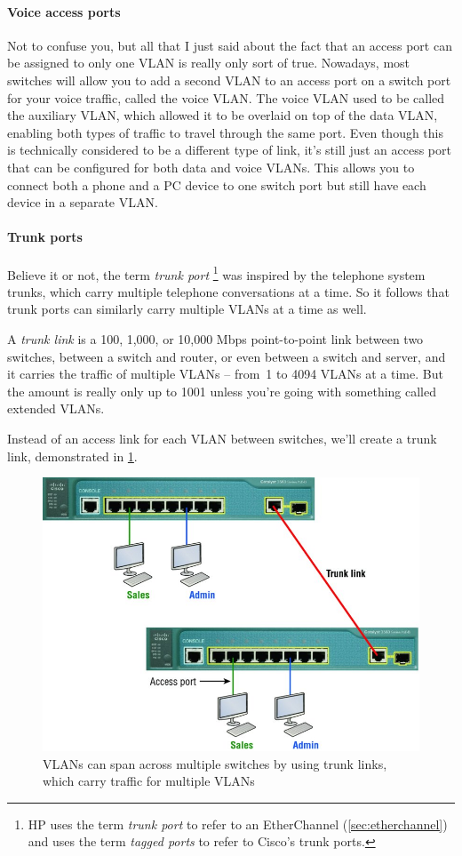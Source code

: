 \paragraph{Voice access ports}
Not to confuse you, but all that I just said about the fact that an access port can be assigned to only one VLAN is really only sort of true.
Nowadays, most switches will allow you to add a second VLAN to an access port on a switch port for your voice traffic,
called the voice VLAN. The voice VLAN used to be called the auxiliary
VLAN, which allowed it to be overlaid on top of the data VLAN, enabling
both types of traffic to travel through the same port. Even though this
is technically considered to be a different type of link, it's still
just an access port that can be configured for both data and voice
VLANs. This allows you to connect both a phone and a PC device to one
switch port but still have each device in a separate VLAN.

\paragraph{Trunk ports}
Believe it or not, the term \emph{trunk port}%
\footnote{HP uses the term \emph{trunk port} to refer to an EtherChannel (\vref{sec:etherchannel}) and uses the term \emph{tagged ports} to refer to Cisco's trunk ports.}
was inspired by the telephone system trunks, which carry multiple telephone conversations at a time.
So it follows that trunk ports can similarly carry multiple VLANs at a time as well.

A \emph{trunk link} is a 100, 1,000, or 10,000 Mbps point-to-point link between two switches, between a switch and router, or even between a switch and server, and it carries the traffic of multiple VLANs -- from~1 to 4094 VLANs at a time.
But the amount is really only up to 1001 unless you're going with something called extended VLANs.

Instead of an access link for each VLAN between switches, we'll create a trunk link, demonstrated in \cref{fig:trunk-links}.

\begin{figure}
   \centering
   \includegraphics{images/c11f006.jpg}
   \caption{VLANs can span across multiple switches by using trunk links, which carry traffic for multiple VLANs}
   \label{fig:trunk-links}
\end{figure}

